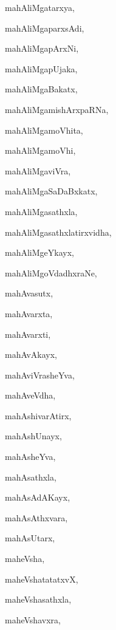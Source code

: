 \begin{multicols}{2}
{mahAliMgatarxya}, \pageref{mahAliMgatarxya}

{mahAliMgaparxsAdi}, \pageref{mahAliMgaparxsAdi}

{mahAliMgapArxNi}, \pageref{mahAliMgapArxNi}

{mahAliMgapUjaka}, \pageref{mahAliMgapUjaka}

{mahAliMgaBakatx}, \pageref{mahAliMgaBakatx}

{mahAliMgamishArxpaRNa}, \pageref{mahAliMgamishArxpaRNa}

{mahAliMgamoVhita}, \pageref{mahAliMgamoVhita}

{mahAliMgamoVhi}, \pageref{mahAliMgamoVhi}

{mahAliMgaviVra}, \pageref{mahAliMgaviVra}

{mahAliMgaSaDaBxkatx}, \pageref{mahAliMgaSaDaBxkatx}

{mahAliMgasathxla}, \pageref{mahAliMgasathxla}

{mahAliMgasathxlatirxvidha}, \pageref{mahAliMgasathxlatirxvidha}

{mahAliMgeYkayx}, \pageref{mahAliMgeYkayx}

{mahAliMgoVdadhxraNe}, \pageref{mahAliMgoVdadhxraNe}

{mahAvasutx}, \pageref{mahAvasutx}

{mahAvarxta}, \pageref{mahAvarxta}

{mahAvarxti}, \pageref{mahAvarxti}

{mahAvAkayx}, \pageref{mahAvAkayx}

{mahAviVrasheYva}, \pageref{mahAviVrasheYva}

{mahAveVdha}, \pageref{mahAveVdha}

{mahAshivarAtirx}, \pageref{mahAshivarAtirx}

{mahAshUnayx}, \pageref{mahAshUnayx}

{mahAsheYva}, \pageref{mahAsheYva}

{mahAsathxla}, \pageref{mahAsathxla}

{mahAsAdAKayx}, \pageref{mahAsAdAKayx}

{mahAsAthxvara}, \pageref{mahAsAthxvara}

{mahAsUtarx}, \pageref{mahAsUtarx}

{maheVsha}, \pageref{maheVsha}

{maheVshatatatxvX}, \pageref{maheVshatatatxvX}

{maheVshasathxla}, \pageref{maheVshasathxla}

{maheVshavxra}, \pageref{maheVshavxra}


\end{multicols}
